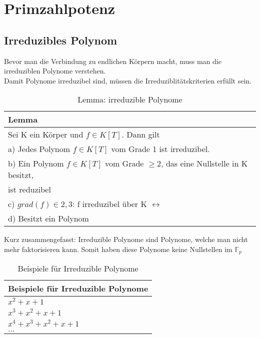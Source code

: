 \section{Primzahlpotenz}

\subsection*{Irreduzibles Polynom}


Bevor man die Verbindung zu endlichen Körpern macht, muss man die irreduziblen Polynome verstehen.\\
Damit Polynome irreduzibel sind, müssen die Irreduziblitätskriterien erfüllt sein.\\

\begin{table}[!ht]
    \centering
        \begin{tabular}{l}
            \toprule
            \textbf{Lemma}\\
            \midrule
            Sei K ein Körper und $ f \in K[T]$. Dann gilt\\
            a) Jedes Polynom $ f \in K[T]$ vom Grade 1 ist irreduzibel.\\
            b) Ein Polynom $ f \in K[T]$ vom Grade $\geq 2$, das eine Nullstelle in K besitzt,\\
             ist reduzibel \\
            c) $grad(f) \in {2,3}$: f irreduzibel über K $ \leftrightarrow $ \\
            d) Besitzt ein Polynom $ $\\
           \bottomrule
        \end{tabular}
        \caption{Lemma: irreduzible Polynome \cite{IrKr}}
        \label{tab3}
    \end{table}


Kurz zusammengefasst: Irreduzible Polynome sind Polynome, welche man nicht mehr faktorisieren kann. Somit haben diese Polynome keine Nullstellen im $\mathbb{F}_{p} $


\begin{table}[!ht]
    \centering
        \begin{tabular}{l}
            \toprule
            \textbf{Beispiele für Irreduzible Polynome}\\
            \midrule
            $ x^2+ x + 1$\\
            $x^3 + x^2 + x + 1$ \\
            $x^4 + x^3  + x^2 + x + 1$\\
            $...$\\
           \bottomrule
        \end{tabular}
        \caption{Beispiele für Irreduzible Polynome}
        \label{tab3}
    \end{table}

